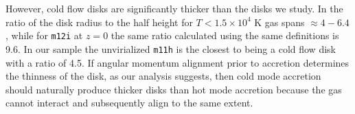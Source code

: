 \documentclass[fleqn,usenatbib]{mnras}
\begin{document}
However, cold flow disks are significantly thicker than the disks we study.
In \cite{Dekel2020a} the ratio of the disk radius to the half height for $T < 1.5 \times 10^4$ K gas spans $\approx 4-6.4$, while for \texttt{m12i} at $z=0$ the same ratio calculated using the same definitions is 9.6.
In our sample the unvirialized \texttt{m11h} is the closest to being a cold flow disk with a ratio of 4.5.
If angular momentum alignment prior to accretion determines the thinness of the disk, as our analysis suggests, then cold mode accretion should naturally produce thicker disks than hot mode accretion because the gas cannot interact and subsequently align to the same extent.




\end{document}
